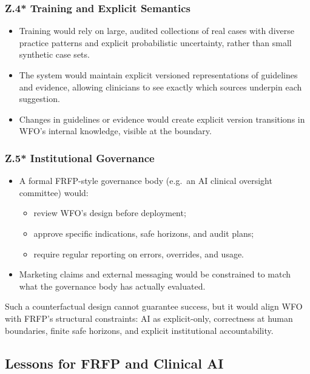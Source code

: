 \subsubsection*{Z.4* Training and Explicit Semantics}

\begin{itemize}
  \item Training would rely on large, audited collections of real cases with
        diverse practice patterns and explicit probabilistic uncertainty,
        rather than small synthetic case sets.
  \item The system would maintain explicit versioned representations of
        guidelines and evidence, allowing clinicians to see exactly which
        sources underpin each suggestion.
  \item Changes in guidelines or evidence would create explicit version
        transitions in WFO’s internal knowledge, visible at the boundary.
\end{itemize}

\subsubsection*{Z.5* Institutional Governance}

\begin{itemize}
  \item A formal FRFP-style governance body (e.g.\ an AI clinical oversight
        committee) would:
        \begin{itemize}
          \item review WFO’s design before deployment;
          \item approve specific indications, safe horizons, and audit plans;
          \item require regular reporting on errors, overrides, and usage.
        \end{itemize}
  \item Marketing claims and external messaging would be constrained to
        match what the governance body has actually evaluated.
\end{itemize}

Such a counterfactual design cannot guarantee success, but it would align
WFO with FRFP’s structural constraints:
AI as explicit-only, correctness at human boundaries, finite safe horizons,
and explicit institutional accountability.

\subsection{Lessons for FRFP and Clinical AI}

